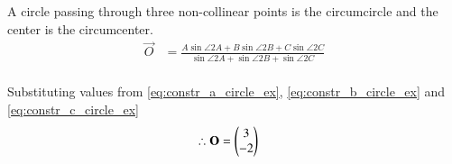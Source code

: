 \solution A circle passing through three non-collinear points is the circumcircle and the center is the circumcenter.\\
\begin{align}
\vec{O} &= \frac{A\sin{\angle 2A} + B\sin{\angle 2B} + C\sin{\angle 2C}}{\sin{\angle 2A} + \sin{\angle 2B} + \sin{\angle 2C}}
\end{align}\\
Substituting values from \ref{eq:constr_a_circle_ex}, \ref{eq:constr_b_circle_ex} and \ref{eq:constr_c_circle_ex}
\begin{align}
\therefore \mathbf{O} &= \begin{pmatrix}3\\-2\end{pmatrix}
\end{align}






